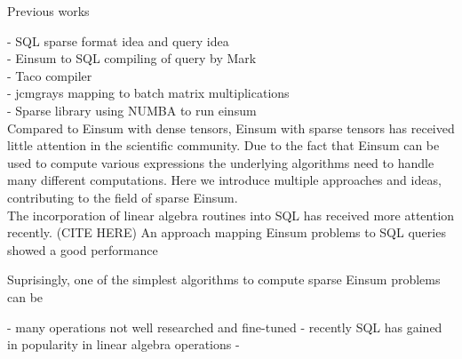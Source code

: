 Previous works

- SQL sparse format idea and query idea~\cite{OJBD_2019v5i1n01_Marten}\\
- Einsum to SQL compiling of query by Mark~\cite{sql_einsum}\\
- Taco compiler\\
- jcmgrays mapping to batch matrix multiplications\\
- Sparse library using NUMBA to run einsum\\



Compared to Einsum with dense tensors, Einsum with sparse tensors has received
little attention in the scientific community. Due to the fact that Einsum can
be used to compute various expressions the underlying algorithms need to handle
many different computations. Here we introduce multiple approaches and ideas,
contributing to the field of sparse Einsum.\\
The incorporation of linear algebra routines into SQL has received more attention
recently. (CITE HERE)
An approach mapping Einsum problems to SQL queries showed a good performance 
 
Suprisingly, one of the simplest algorithms to compute sparse Einsum problems
can be 

- many operations not well researched and fine-tuned
- recently SQL has gained in popularity in linear algebra operations
- 